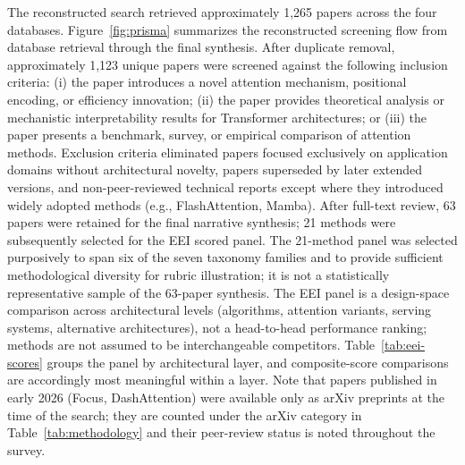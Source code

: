 \documentclass[10pt,twocolumn]{article}
\begin{document}
The reconstructed search retrieved approximately 1,265 papers across the four databases. Figure~\ref{fig:prisma} summarizes the reconstructed screening flow from database retrieval through the final synthesis. After duplicate removal, approximately 1,123 unique papers were screened against the following inclusion criteria: (i) the paper introduces a novel attention mechanism, positional encoding, or efficiency innovation; (ii) the paper provides theoretical analysis or mechanistic interpretability results for Transformer architectures; or (iii) the paper presents a benchmark, survey, or empirical comparison of attention methods. Exclusion criteria eliminated papers focused exclusively on application domains without architectural novelty, papers superseded by later extended versions, and non-peer-reviewed technical reports except where they introduced widely adopted methods (e.g., FlashAttention, Mamba). After full-text review, 63 papers were retained for the final narrative synthesis; 21 methods were subsequently selected for the EEI scored panel. The 21-method panel was selected purposively to span six of the seven taxonomy families and to provide sufficient methodological diversity for rubric illustration; it is not a statistically representative sample of the 63-paper synthesis. The EEI panel is a design-space comparison across architectural levels (algorithms, attention variants, serving systems, alternative architectures), not a head-to-head performance ranking; methods are not assumed to be interchangeable competitors. Table~\ref{tab:eei-scores} groups the panel by architectural layer, and composite-score comparisons are accordingly most meaningful within a layer. Note that papers published in early 2026 (Focus, DashAttention) were available only as arXiv preprints at the time of the search; they are counted under the arXiv category in Table~\ref{tab:methodology} and their peer-review status is noted throughout the survey.
\end{document}
